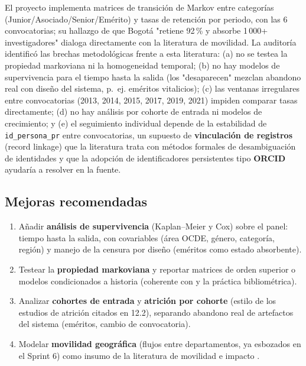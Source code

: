 El proyecto implementa matrices de transición de Markov entre categorías
(Junior/Asociado/Senior/Emérito) y tasas de retención por periodo, con las 6
convocatorias; su hallazgo de que Bogotá "retiene 92\,\% y absorbe 1\,000+
investigadores" dialoga directamente con la literatura de movilidad. La
auditoría identificó las brechas metodológicas frente a esta literatura: (a)
no se testea la propiedad markoviana ni la homogeneidad temporal; (b) no hay
modelos de supervivencia para el tiempo hasta la salida (los "desaparecen"
mezclan abandono real con diseño del sistema, p.~ej. eméritos vitalicios); (c)
las ventanas irregulares entre convocatorias (2013, 2014, 2015, 2017, 2019,
2021) impiden comparar tasas directamente; (d) no hay análisis por cohorte de
entrada ni modelos de crecimiento; y (e) el seguimiento individual depende de
la estabilidad de \texttt{id\_persona\_pr} entre convocatorias, un supuesto de
\textbf{vinculación de registros} (record linkage) que la literatura trata con
métodos formales de desambiguación de identidades \citep{christen2012data} y
que la adopción de identificadores persistentes tipo \textbf{ORCID} ayudaría
a resolver en la fuente.

\subsection{Mejoras recomendadas}

\begin{enumerate}
  \item Añadir \textbf{análisis de supervivencia} (Kaplan--Meier y Cox) sobre
        el panel: tiempo hasta la salida, con covariables (área OCDE, género,
        categoría, región) y manejo de la censura por diseño (eméritos como
        estado absorbente).
  \item Testear la \textbf{propiedad markoviana} y reportar matrices de orden
        superior o modelos condicionados a historia (coherente con
        \citet{kemeny1976finite} y la práctica bibliométrica).
  \item Analizar \textbf{cohortes de entrada} y \textbf{atrición por cohorte}
        (estilo de los estudios de atrición citados en 12.2), separando
        abandono real de artefactos del sistema (eméritos, cambio de
        convocatoria).
  \item Modelar \textbf{movilidad geográfica} (flujos entre departamentos, ya
        esbozados en el Sprint 6) como insumo de la literatura de movilidad e
        impacto \citep{sugimoto2017scientists}.
\end{enumerate}
